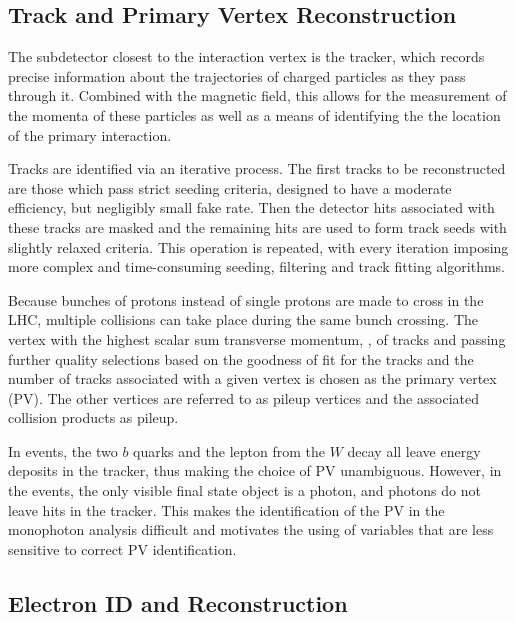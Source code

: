 \subsection{Track and Primary Vertex Reconstruction}\label{sec:vertexreco}
 The subdetector closest to the interaction vertex
  is the tracker, which records precise
  information about the trajectories of 
  charged particles as they pass through it.
 Combined with the magnetic field, 
  this allows for the measurement of the
  momenta of these particles as well as a
  means of identifying the the location of
  the primary interaction.

 Tracks are identified via an iterative process. 
 The first tracks to be reconstructed
  are those which pass strict seeding
  criteria, designed to have a moderate
  efficiency, but negligibly small
  fake rate.
 Then the detector hits associated
  with these tracks are masked
  and the remaining hits are used to
  form track seeds with slightly relaxed
  criteria.
 This operation is repeated, with every
  iteration imposing more complex and time-consuming
  seeding, filtering and track fitting algorithms.
 
 Because bunches of protons instead of single protons
  are made to cross in the LHC, 
  multiple collisions can take place during the same
  bunch crossing.
 The vertex with the highest scalar sum
  transverse momentum, \pt,
  of tracks and passing further quality selections
  based on the goodness of fit for the tracks
  and the number of tracks associated with a given vertex
  is chosen as the primary vertex (PV).
 The other vertices are referred to as
  pileup vertices and the associated collision
  products as pileup.

 In \ppwbblnbb events, the two $b$ quarks and
  the lepton from the $W$ decay all leave energy
  deposits in the tracker, thus making the choice
  of PV unambiguous.
 However, in the \pploneg events,
  the only visible final state object is a photon,
  and photons do not leave hits in the tracker.
 This makes the identification of the PV
  in the monophoton analysis difficult
  and motivates the using of variables that
  are less sensitive to correct PV identification.
  
\subsection{Electron ID and Reconstruction}

